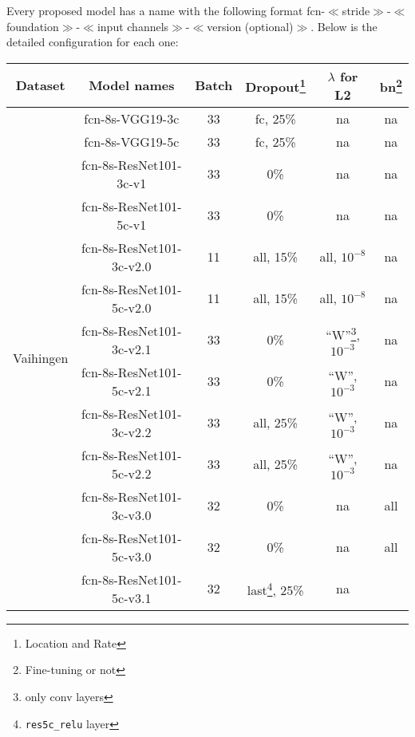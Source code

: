 Every proposed model has a name with the following format
\acrshort{fcn}-$\ll$stride$\gg$-$\ll$foundation$\gg$-$\ll$input
channels$\gg$-$\ll$version (optional)$\gg$. Below is the detailed configuration
for each one:
\begin{table}[h]
    \centering
    \begin{tabular}{ | c | c | c | c | c | c | }
        \hline
        Dataset & Model names & Batch & Dropout\footnote{Location and Rate}
        & $\lambda$ for L2 & \acrshort{bn}\footnote{Fine-tuning or not} \\
        \hline
        \multirow{15}{4em}{Vaihingen}
        & \acrshort{fcn}-8s-VGG19-3c & 33 & \acrshort{fc}, 25\% & \acrshort{na}
        & \acrshort{na} \\
        & \acrshort{fcn}-8s-VGG19-5c & 33 & \acrshort{fc}, 25\% & \acrshort{na}
        & \acrshort{na} \\
        \cline{2-6}
        & \acrshort{fcn}-8s-ResNet101-3c-v1 & 33 & 0\% & \acrshort{na}
        & \acrshort{na} \\
        & \acrshort{fcn}-8s-ResNet101-5c-v1 & 33 & 0\% & \acrshort{na}
        & \acrshort{na} \\
        \cline{2-6}
        & \acrshort{fcn}-8s-ResNet101-3c-v2.0 & 11 & all, 15\% & all, $10^{-8}$
        & \acrshort{na} \\
        & \acrshort{fcn}-8s-ResNet101-5c-v2.0 & 11 & all, 15\% & all, $10^{-8}$
        & \acrshort{na} \\
        \cline{2-6}
        & \acrshort{fcn}-8s-ResNet101-3c-v2.1 & 33 & 0\%
        & ``W''\footnote{only \acrshort{conv} layers}, $10^{-3}$ & \acrshort{na} \\
        & \acrshort{fcn}-8s-ResNet101-5c-v2.1 & 33 & 0\%
        & ``W'', $10^{-3}$ & \acrshort{na} \\
        \cline{2-6}
        & \acrshort{fcn}-8s-ResNet101-3c-v2.2 & 33 & all, 25\%
        & ``W'', $10^{-3}$ & \acrshort{na} \\
        & \acrshort{fcn}-8s-ResNet101-5c-v2.2 & 33 & all, 25\%
        & ``W'', $10^{-3}$ & \acrshort{na} \\
        \cline{2-6}
        & \acrshort{fcn}-8s-ResNet101-3c-v3.0 & 32 & 0\%
        & \acrshort{na} & all \\
        & \acrshort{fcn}-8s-ResNet101-5c-v3.0 & 32 & 0\%
        & \acrshort{na} & all \\
        \cline{2-6}
        & \acrshort{fcn}-8s-ResNet101-5c-v3.1 & 32
        & last\footnote{\texttt{res5c\_relu} layer}, 25\% & \acrshort{na}

\end{tabular}
\end{table}

